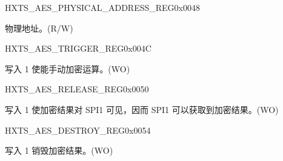 \begin{register}{H}{XTS\_AES\_PHYSICAL\_ADDRESS\_REG}{0x{}0048}\label{regdesc:XTSAESPHYSICALADDRESSREG}
%
%
\regnewline%
\begin{regdesc}\begin{reglist}
\item [XTS\_AES\_PHYSICAL\_ADDRESS] 物理地址。(R/W)
\end{reglist}\end{regdesc}
\end{register}

\begin{register}{H}{XTS\_AES\_TRIGGER\_REG}{0x{}004C}\label{regdesc:XTSAESTRIGGERREG}
%
%
\regnewline%
\begin{regdesc}\begin{reglist}
\item [XTS\_AES\_TRIGGER] 写入 1 使能手动加密运算。(WO)
\end{reglist}\end{regdesc}
\end{register}

\begin{register}{H}{XTS\_AES\_RELEASE\_REG}{0x{}0050}\label{regdesc:XTSAESRELEASEREG}
%
%
\regnewline%
\begin{regdesc}\begin{reglist}
\item [XTS\_AES\_RELEASE] 写入 1 使加密结果对 SPI1 可见，因而 SPI1 可以获取到加密结果。(WO)
\end{reglist}\end{regdesc}
\end{register}

\begin{register}{H}{XTS\_AES\_DESTROY\_REG}{0x{}0054}\label{regdesc:XTSAESDESTROYREG}
%
%
\regnewline%
\begin{regdesc}\begin{reglist}
\item [XTS\_AES\_DESTROY] 写入 1 销毁加密结果。(WO)
\end{reglist}\end{regdesc}
\end{register}


